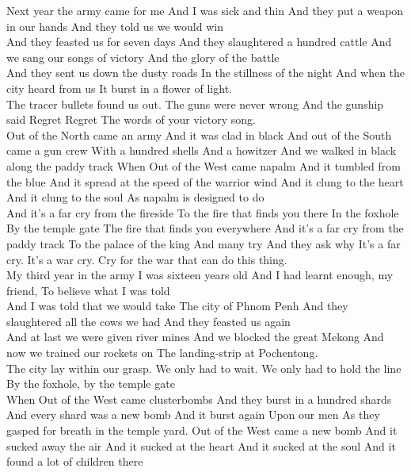 \begin{poem}
 Next year the army came for me
 And I was sick and thin
 And they put a weapon in our hands
 And they told us we would win\\
 
 And they feasted us for seven days
 And they slaughtered a hundred cattle
 And we sang our songs of victory
 And the glory of the battle\\
 
 And they sent us down the dusty roads
 In the stillness of the night
 And when the city heard from us
 It burst in a flower of light.\\
 
 The tracer bullets found us out.
 The guns were never wrong
 And the gunship said Regret Regret
 The words of your victory song.\\
 
 Out of the North came an army
 And it was clad in black
 And out of the South came a gun crew
 With a hundred shells
 And a howitzer
 And we walked in black along the paddy track
 When
 Out of the West came napalm
 And it tumbled from the blue
 And it spread at the speed of the warrior wind
 And it clung to the heart
 And it clung to the soul
 As napalm is designed to do\\
 
 And it's a far cry from the fireside
 To the fire that finds you there
 In the foxhole
 By the temple gate
 The fire that finds you everywhere
 And it's a far cry from the paddy track
 To the palace of the king
 And many try
 And they ask why
 It's a far cry.
 It's a war cry.
 Cry for the war that can do this thing.\\
 
 My third year in the army
 I was sixteen years old
 And I had learnt enough, my friend,
 To believe what I was told\\
 
 And I was told that we would take
 The city of Phnom Penh
 And they slaughtered all the cows we had
 And they feasted us again\\
 
 And at last we were given river mines
 And we blocked the great Mekong
 And now we trained our rockets on
 The landing-strip at Pochentong.\\
 
 The city lay within our grasp.
 We only had to wait.
 We only had to hold the line
 By the foxhole, by the temple gate\\
 
 When
 Out of the West came clusterbombs
 And they burst in a hundred shards
 And every shard was a new bomb
 And it burst again
 Upon our men
 As they gasped for breath in the temple yard.
 Out of the West came a new bomb
 And it sucked away the air
 And it sucked at the heart
 And it sucked at the soul
 And it found a lot of children there\\
 

\end{poem}
